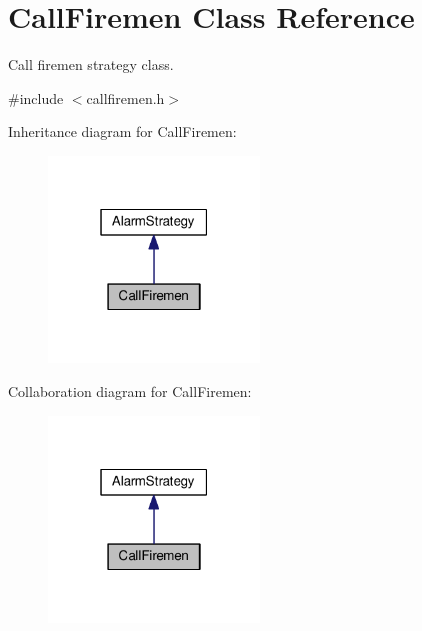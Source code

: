 \hypertarget{classCallFiremen}{}\section{Call\+Firemen Class Reference}
\label{classCallFiremen}


Call firemen strategy class.  




{\ttfamily \#include $<$callfiremen.\+h$>$}



Inheritance diagram for Call\+Firemen\+:\nopagebreak
\begin{figure}[H]
\begin{center}
\leavevmode
\includegraphics[width=159pt]{classCallFiremen__inherit__graph}
\end{center}
\end{figure}


Collaboration diagram for Call\+Firemen\+:\nopagebreak
\begin{figure}[H]
\begin{center}
\leavevmode
\includegraphics[width=159pt]{classCallFiremen__coll__graph}
\end{center}
\end{figure}

